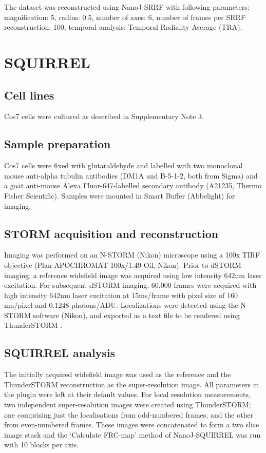 The dataset was reconstructed using NanoJ-SRRF with following parameters: magnification: 5, radius: 0.5, number of axes: 6,  number of frames per SRRF reconstruction: 100, temporal analysis: Temporal Radiality Average (TRA). 


\section{SQUIRREL}

\subsection{Cell lines}
Cos7 cells were cultured as described in Supplementary Note 3.

\subsection{Sample preparation}

Cos7 cells were fixed with glutaraldehyde and labelled with two monoclonal mouse anti-alpha tubulin antibodies (DM1A and B-5-1-2, both from Sigma) and a goat anti-mouse Alexa Fluor-647-labelled secondary antibody (A21235, Thermo Fisher Scientific). Samples were mounted in Smart Buffer (Abbelight) for imaging.

\subsection{STORM acquisition and reconstruction}

Imaging was performed on an N-STORM (Nikon) microscope using a 100x TIRF objective (Plan-APOCHROMAT 100x/1.49 Oil, Nikon). Prior to dSTORM imaging, a reference widefield image was acquired using low intensity 642nm laser excitation. For subsequent dSTORM imaging, 60,000 frames were acquired with high intensity 642nm laser excitation at 15ms/frame with pixel size of 160 nm/pixel and 0.1248 photons/ADU. Localizations were detected using the N-STORM software (Nikon), and exported as a text file to be rendered using ThunderSTORM \cite{ovesny2014thunderstorm}.

\subsection{SQUIRREL analysis}

The initially acquired widefield image was used as the reference and the ThunderSTORM reconstruction as the super-resolution image. All parameters in the plugin were left at their default values. For local resolution measurements, two independent super-resolution images were created using ThunderSTORM; one comprising just the localisations from odd-numbered frames, and the other from even-numbered frames. These images were concatenated to form a two slice image stack and the ‘Calculate FRC-map’ method of NanoJ-SQUIRREL was run with 10 blocks per axis.


